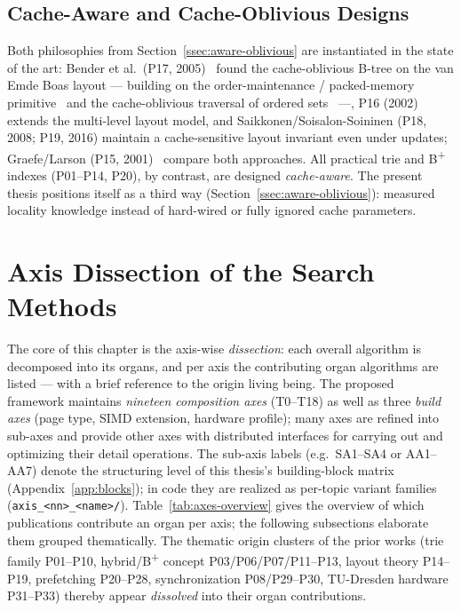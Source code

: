 \subsection{Cache-Aware and Cache-Oblivious Designs}\label{ssec:sota-aware}
Both philosophies from Section~\ref{ssec:aware-oblivious} are instantiated in the state of the art:
Bender et al.\ (P17, 2005)~\cite{bender2005coboblivious} found the cache-oblivious B-tree on the van
Emde Boas layout --- building on the order-maintenance / packed-memory
primitive~\cite{bender2002orderlist} and the cache-oblivious traversal of ordered
sets~\cite{bender2002scanning} ---, P16 (2002)~\cite{bender2000cobtree} extends the multi-level
layout model, and Saikkonen/Soisalon-Soininen (P18, 2008; P19, 2016) maintain a cache-sensitive
layout invariant even under updates; Graefe/Larson (P15, 2001)~\cite{graefe2001btree} compare both
approaches. All practical trie and B\textsuperscript{+} indexes (P01--P14, P20), by contrast, are
designed \emph{cache-aware}. The present thesis positions itself as a third way
(Section~\ref{ssec:aware-oblivious}): measured locality knowledge instead of hard-wired or fully
ignored cache parameters.

\section{Axis Dissection of the Search Methods}\label{sec:sota-axes}
The core of this chapter is the axis-wise \emph{dissection}: each overall algorithm is decomposed
into its organs, and per axis the contributing organ algorithms are listed --- with a brief
reference to the origin living being. The proposed framework maintains
\emph{nineteen composition axes} (T0--T18) as well as three \emph{build axes} (page type, SIMD
extension, hardware profile); many axes are refined into sub-axes and provide other axes with
distributed interfaces for carrying out and optimizing their detail operations. The sub-axis labels
(e.g.\ SA1--SA4 or AA1--AA7) denote the structuring level of this thesis's building-block matrix
(Appendix~\ref{app:blocks}); in code they are realized as per-topic variant families
(\texttt{axis\_<nn>\_<name>/}). Table~\ref{tab:axes-overview} gives the overview of which
publications contribute an organ per axis; the following subsections elaborate them grouped
thematically. The thematic origin clusters of the prior works (trie family P01--P10,
hybrid/B\textsuperscript{+} concept P03/P06/P07/P11--P13, layout theory P14--P19, prefetching
P20--P28, synchronization P08/P29--P30, TU-Dresden hardware P31--P33) thereby appear
\emph{dissolved} into their organ contributions.

